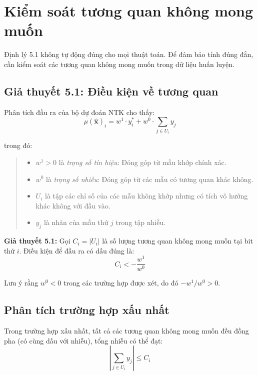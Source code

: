 \section{Kiểm soát tương quan không mong muốn}

Định lý 5.1 không tự động đúng cho mọi thuật toán. Để đảm bảo tính đúng đắn, cần kiểm soát các tương quan không mong muốn trong dữ liệu huấn luyện.

\subsection{Giả thuyết 5.1: Điều kiện về tương quan}

Phân tích đầu ra của bộ dự đoán NTK cho thấy:
\begin{equation}
    \mu(\hat{\mathbf{x}})_i = w^1 \cdot y_i^* + w^0 \cdot \sum_{j \in U_i} y_j
\end{equation}

trong đó:
\begin{quote}
\begin{itemize}
    \item $w^1 > 0$ là \textit{trọng số tín hiệu}: Đóng góp từ mẫu khớp chính xác.
    \item $w^0$ là \textit{trọng số nhiễu}: Đóng góp từ các mẫu có tương quan khác không.
    \item $U_i$ là tập các chỉ số của các mẫu không khớp nhưng có tích vô hướng khác không với đầu vào.
    \item $y_j$ là nhãn của mẫu thứ $j$ trong tập nhiễu.
\end{itemize}
\end{quote}

        \textbf{Giả thuyết 5.1:} Gọi $C_i = |U_i|$ là số lượng tương quan không mong muốn tại bit thứ $i$. Điều kiện để đầu ra có dấu đúng là:
\begin{equation}
    C_i < -\frac{w^1}{w^0}
\end{equation}

Lưu ý rằng $w^0 < 0$ trong các trường hợp được xét, do đó $-w^1/w^0 > 0$.

\subsection{Phân tích trường hợp xấu nhất}

Trong trường hợp xấu nhất, tất cả các tương quan không mong muốn đều đồng pha (có cùng dấu với nhiễu), tổng nhiễu có thể đạt:
\begin{equation}
    \left|\sum_{j \in U_i} y_j\right| \leq C_i
\end{equation}

